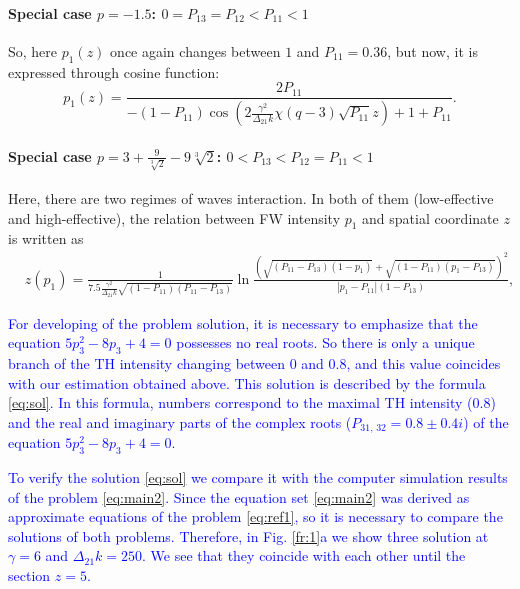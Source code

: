 \documentclass[a4paper, 12pt, onecolumn]{extarticle}
\begin{document}
{\paragraph*{Special case $p=-1.5$: $0=P_{13}=P_{12}<P_{11}<1$}
So, here $p_1(z)$ once again changes between $1$ and $P_{11}=0.36$, but now, it is expressed through cosine function:
\begin{equation}
\label{eq:p1_3}
p_1(z)=\frac{2P_{11}}{-(1-P_{11})\cos(2\frac{\gamma^2}{\Delta_{21}k}\chi(q-3)\sqrt{P_{11}}z)+1+P_{11}}.
\end{equation}
\paragraph*{Special case $p=3+\frac{9}{\sqrt[3]{2}}-9\sqrt[3]{2}$: $0<P_{13}<P_{12}=P_{11}<1$}
Here, there are two regimes of waves interaction. In both of them (low-effective and high-effective), the relation between FW intensity $p_1$ and spatial coordinate $z$ is written as
\begin{equation}
\label{eq:p1_4}
\begin{aligned}
&z(p_1)=\frac{1}{7.5\frac{\gamma^2}{\Delta_{21}k}\sqrt{(1-P_{11})(P_{11}-P_{13})}}\ln\frac{\left(\sqrt{(P_{11}-P_{13})(1-p_1)}+\sqrt{(1-P_{11})(p_1-P_{13})}\right)^2}{|p_1-P_{11}|(1-P_{13})},
\end{aligned}
\end{equation}
}
\textcolor{blue}
{
For developing of the problem solution, it is necessary to emphasize that the equation \(5p_3^2-8p_3+4=0\) possesses no real roots. So there is only a unique branch of the TH intensity changing between \(0\) and \(0.8\), and this value coincides with our estimation obtained above. This solution is described by the formula \eqref{eq:sol}. In this formula, numbers correspond to the maximal TH intensity (\(0.8\)) and the real and imaginary parts of the complex roots (\(P_{31,\,32}=0.8\pm0.4i\)) of the equation \(5p_3^2-8p_3+4=0\).
}

\textcolor{blue}
{
To verify the solution \eqref{eq:sol} we compare it with the computer simulation results of the problem \eqref{eq:main2}. Since the equation set \eqref{eq:main2} was derived as approximate equations of the problem \eqref{eq:ref1}, so it is necessary to compare the solutions of both problems. Therefore, in Fig. \ref{fr:1}a we show three solution at \(\gamma=6\) and \(\Delta_{21}k=250\). We see that they coincide with each other until the section \(z=5\).
}
\end{document}

